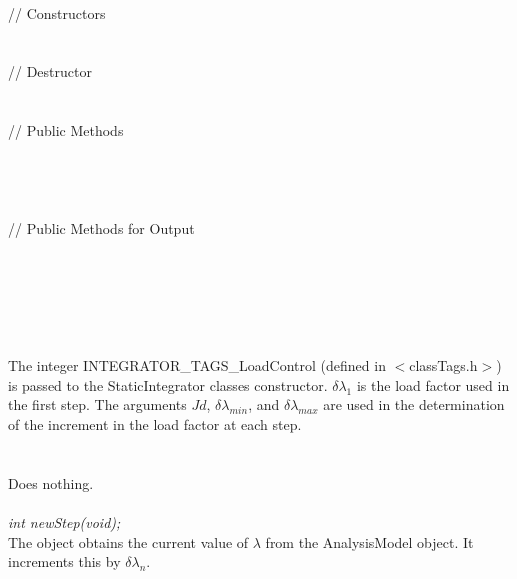  \\
\indent // Constructors \\
\\ \\
\indent // Destructor \\
\\  \\
\indent // Public Methods \\
 \\
 \\
 \\ \\
\indent // Public Methods for Output\\
\\ 
\\ 
\\

 \\
\\ \\
The integer INTEGRATOR\_TAGS\_LoadControl (defined in
$<$classTags.h$>$) is passed to the StaticIntegrator classes
constructor. $\delta \lambda_1$ is the load factor used in the first
step. The arguments $Jd$, $\delta \lambda_{min}$, and $\delta
\lambda_{max}$ are used in the determination of the increment in the
load factor at each step. \\



 \\
\\ 
Does nothing. \\

\\

{\em int newStep(void);} \\
The object obtains the current value of $\lambda$ from the AnalysisModel
object. It increments this by $\delta \lambda_n $.

